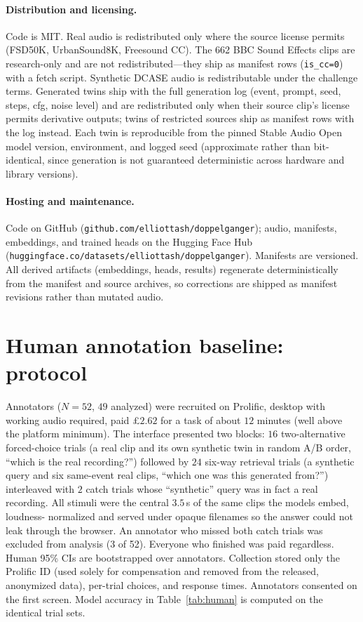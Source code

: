 \documentclass{article}
\begin{document}
\paragraph{Distribution and licensing.} Code is MIT. Real audio is redistributed only where the
source license permits (FSD50K, UrbanSound8K, Freesound CC). The 662 BBC Sound Effects clips are
research-only and are not redistributed---they ship as manifest rows (\texttt{is\_cc=0})
with a fetch script. Synthetic DCASE audio is redistributable under the challenge terms. Generated
twins ship with the full generation log (event, prompt, seed, steps, cfg, noise level) and are
redistributed only when their source clip's license permits derivative outputs; twins of restricted
sources ship as manifest rows with the log instead. Each twin is reproducible from the pinned Stable
Audio Open model version, environment, and logged seed (approximate rather than bit-identical, since
generation is not guaranteed deterministic across hardware and library versions).

\paragraph{Hosting and maintenance.} Code on GitHub (\texttt{github.com/elliottash/doppelganger});
audio, manifests, embeddings, and trained heads on the Hugging Face Hub
(\texttt{huggingface.co/datasets/elliottash/doppelganger}). Manifests are versioned. All derived
artifacts (embeddings, heads, results) regenerate deterministically from the manifest and source
archives, so corrections are shipped as manifest revisions rather than mutated audio.

\section{Human annotation baseline: protocol}
\label{app:human}
Annotators ($N=52$, $49$ analyzed) were recruited on Prolific, desktop with working audio
required, paid \pounds$2.62$ for a task of about $12$ minutes (well above the platform minimum).
The interface presented two blocks: $16$ two-alternative forced-choice trials (a real clip and its
own synthetic twin in random A/B order, ``which is the real recording?'') followed by $24$
six-way retrieval trials (a synthetic query and six same-event real clips, ``which one was this
generated from?'') interleaved with $2$ catch trials whose ``synthetic'' query was in fact a real
recording. All stimuli were the central $3.5$\,s of the same clips the models embed, loudness-
normalized and served under opaque filenames so the answer could not leak through the browser.
An annotator who missed both catch trials was excluded from analysis (3 of 52). Everyone who
finished was paid regardless. Human 95\% CIs are bootstrapped over annotators. Collection stored
only the Prolific ID (used solely for compensation and removed from the released, anonymized data),
per-trial choices, and response times. Annotators consented on the first
screen. Model accuracy in Table~\ref{tab:human} is computed on the identical trial sets.
\end{document}
